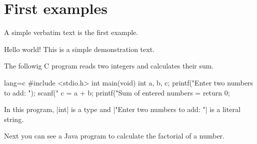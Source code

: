 \documentclass[10pt,a4paper]{article}
\begin{document}
%
%
%

\section{First examples}

A simple verbatim text is the first example.

\begin{Example}
\begin{pygmented}{}
Hello world!
This is a simple demonstration text.
\end{pygmented}
\end{Example}

The followig C program reads two integers and calculates their sum.

\begin{Example}
\begin{pygmented}{lang=c}
#include <stdio.h>
int main(void)
{
int a, b, c;
printf("Enter two numbers to add: ");
scanf("%
c = a + b;
printf("Sum of entered numbers = %
return 0;
}
\end{pygmented}
\end{Example}

\begin{Example}
In this program, \pyginline[lang=c]|int| is a type and
\pyginline[lang=c]|"Enter two numbers to add: "| is a literal string.
\end{Example}

Next you can see a Java program to calculate the factorial of a number.
\end{document}
